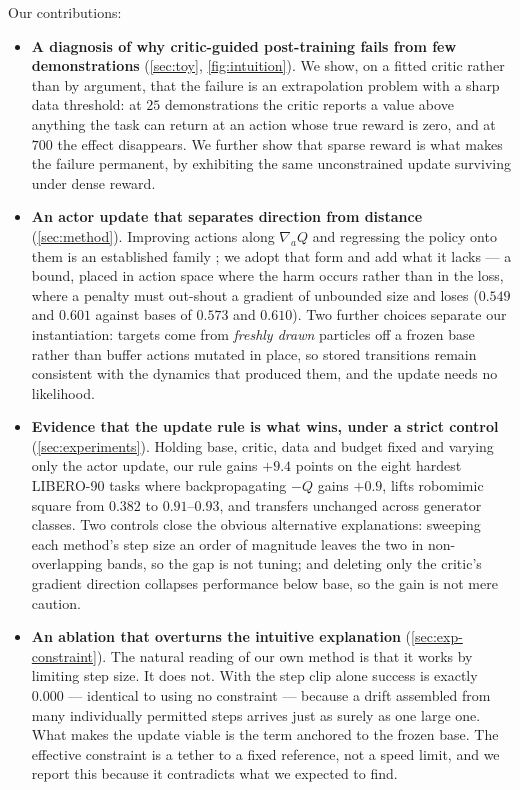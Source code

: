 Our contributions:
\begin{itemize}
  \item \textbf{A diagnosis of why critic-guided post-training fails from few
  demonstrations} (\cref{sec:toy}, \cref{fig:intuition}). We show, on a fitted
  critic rather than by argument, that the failure is an extrapolation problem
  with a sharp data threshold: at $25$ demonstrations the critic reports a
  value above anything the task can return at an action whose true reward is
  zero, and at $700$ the effect disappears. We further show that sparse reward
  is what makes the failure permanent, by exhibiting the same unconstrained
  update surviving under dense reward.

  \item \textbf{An actor update that separates direction from distance}
  (\cref{sec:method}). Improving actions along $\nabla_a Q$ and regressing the
  policy onto them is an established family \citep{dipo2024,psenka2024qsm,
  dprlsurvey2026}; we adopt that form and add what it lacks --- a bound, placed
  in action space where the harm occurs rather than in the loss, where a
  penalty must out-shout a gradient of unbounded size and loses ($0.549$ and
  $0.601$ against bases of $0.573$ and $0.610$). Two further choices separate
  our instantiation: targets come from \emph{freshly drawn} particles off a
  frozen base rather than buffer actions mutated in place, so stored
  transitions remain consistent with the dynamics that produced them, and the
  update needs no likelihood.

  \item \textbf{Evidence that the update rule is what wins, under a strict
  control} (\cref{sec:experiments}). Holding base, critic, data and budget
  fixed and varying only the actor update, our rule gains $+9.4$ points on the
  eight hardest LIBERO-90 tasks where backpropagating $-Q$ gains $+0.9$, lifts
  robomimic square from $0.382$ to $0.91$--$0.93$, and transfers unchanged
  across generator classes. Two controls close the obvious alternative
  explanations: sweeping each method's step size an order of magnitude leaves
  the two in non-overlapping bands, so the gap is not tuning; and deleting only
  the critic's gradient direction collapses performance below base, so the gain
  is not mere caution.

  \item \textbf{An ablation that overturns the intuitive explanation}
  (\cref{sec:exp-constraint}). The natural reading of our own method is that it
  works by limiting step size. It does not. With the step clip alone success is
  exactly $0.000$ --- identical to using no constraint --- because a drift
  assembled from many individually permitted steps arrives just as surely as
  one large one. What makes the update viable is the term anchored to the
  frozen base. The effective constraint is a tether to a fixed reference, not a
  speed limit, and we report this because it contradicts what we expected to
  find.
\end{itemize}